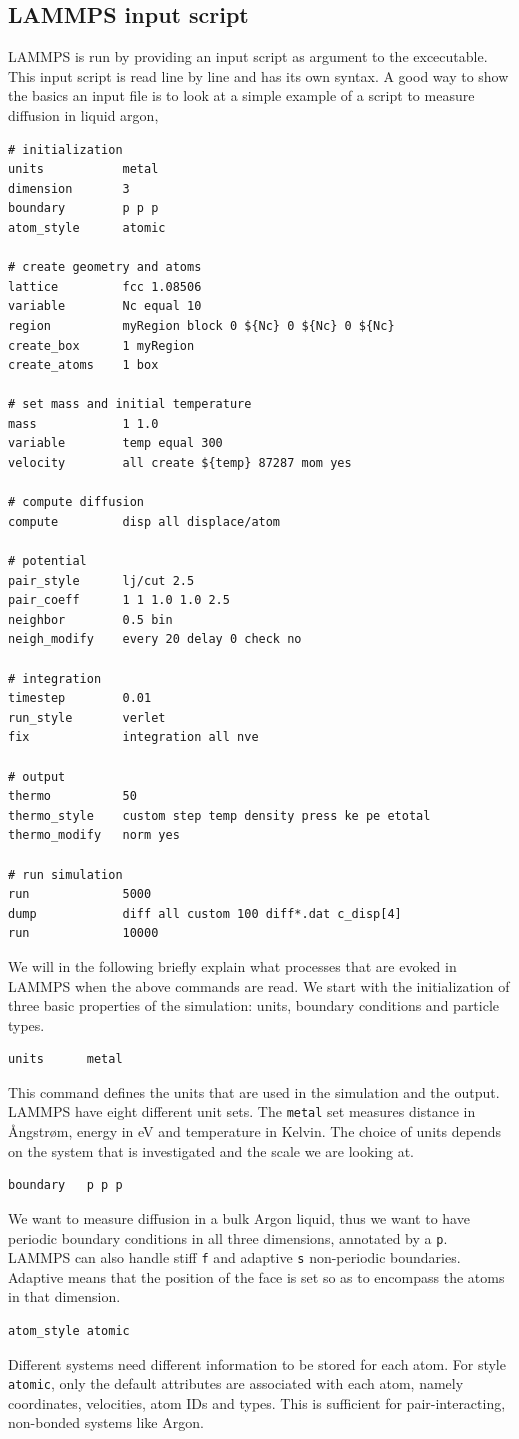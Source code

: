 \documentclass[twoside,english]{uiofysmaster}
\begin{document}
\subsection{LAMMPS input script}
LAMMPS is run by providing an input script as 
argument to the excecutable. This input script
is read line by line and has its own syntax. 
A good way to show the basics an input file
is to look at a simple example of a script
to measure diffusion in liquid argon,
\begin{lstlisting}[style=lammps]
# initialization
units 			metal		
dimension 		3
boundary		p p p		
atom_style		atomic		

# create geometry and atoms
lattice 		fcc 1.08506
variable		Nc equal 10
region 			myRegion block 0 ${Nc} 0 ${Nc} 0 ${Nc}
create_box		1 myRegion
create_atoms	1 box

# set mass and initial temperature
mass			1 1.0
variable		temp equal 300
velocity		all create ${temp} 87287 mom yes 

# compute diffusion
compute 		disp all displace/atom

# potential 
pair_style		lj/cut 2.5
pair_coeff		1 1 1.0 1.0 2.5
neighbor		0.5 bin
neigh_modify	every 20 delay 0 check no

# integration
timestep 		0.01
run_style 		verlet
fix 			integration all nve

# output
thermo			50
thermo_style 	custom step temp density press ke pe etotal 
thermo_modify 	norm yes

# run simulation
run				5000
dump 			diff all custom 100 diff*.dat c_disp[4]
run				10000
\end{lstlisting}
We will in the following briefly explain what
processes that are evoked in LAMMPS when the 
above commands are read. We start with the initialization of 
three basic properties of the simulation: units, boundary conditions and particle types.
\begin{lstlisting}[style=lammps]
 units 		metal
\end{lstlisting}
This command defines the units that are used 
in the simulation and the output. LAMMPS have eight
different unit sets. The \texttt{metal} set measures
distance in \AA{}ngstr\o{}m, energy in eV and temperature
in Kelvin. The choice of units depends on the system
that is investigated and the scale we are looking at.
\begin{lstlisting}[style=lammps]
 boundary 	p p p
\end{lstlisting}
We want to measure diffusion in a bulk
Argon liquid, thus we want to have periodic 
boundary conditions in all three dimensions, 
annotated by a \texttt{p}. LAMMPS can also handle stiff \texttt{f}
and adaptive \texttt{s} non-periodic boundaries. Adaptive
means that the position of the face is set so as to
encompass the atoms in that dimension. 
\begin{lstlisting}[style=lammps]
 atom_style atomic
\end{lstlisting}
Different systems need different information
to be stored for each atom. For style \texttt{atomic}, only
the default attributes are associated with each atom, 
namely coordinates, velocities, atom IDs and types. 
This is sufficient for pair-interacting, non-bonded
systems like Argon.
\end{document}
